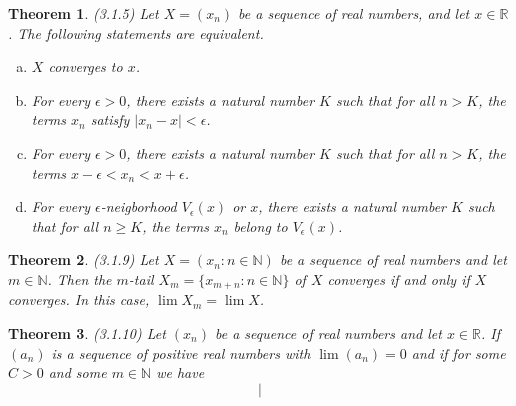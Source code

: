 \documentclass{article}
\newtheorem*{theorem}{Theorem}
\begin{document}
\begin{theorem}(3.1.5) Let $X=(x_n)$ be a sequence of real numbers, and let $x\in{\mathbb{R}}$.
  The following statements are equivalent.
  \begin{enumerate}[(a)]
    \item $X$ converges to $x$.
    \item For every $\epsilon>0$, there exists a natural number $K$ such that for all $n>K$,
      the terms $x_n$ satisfy $|x_n-x|<\epsilon$.
    \item For every $\epsilon>0$, there exists a natural number $K$ such that for all $n>K$,
      the terms $x-\epsilon<x_n<x+\epsilon$.
    \item For every $\epsilon$-neigborhood $V_{\epsilon}(x)$ or $x$, there exists a natural number
      $K$ such that for all $n\ge{K}$, the terms $x_n$ belong to $V_{\epsilon}(x)$.
  \end{enumerate}
\end{theorem}

\begin{theorem}(3.1.9) Let $X=(x_n:n\in{\mathbb{N}})$ be a sequence of real numbers and let
  $m\in{\mathbb{N}}$. Then the $m$-tail $X_m=\{x_{m+n}:n\in{\mathbb{N}}\}$ of $X$ converges
  if and only if $X$ converges. In this case, $\lim{X_m}=\lim{X}$.
\end{theorem}

\begin{theorem}(3.1.10) Let $(x_n)$ be a sequence of real numbers and let $x\in{\mathbb{R}}$.
  If $(a_n)$ is a sequence of positive real numbers with $\lim{(a_n)}=0$ and if for some $C>0$
  and some $m\in{\mathbb{N}}$ we have
  $$|$$
  
\end{theorem}
\end{document}
